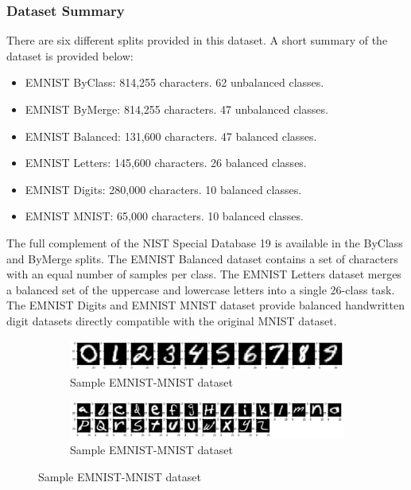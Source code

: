 \subsubsection{Dataset Summary}
There are six different splits provided in this dataset. A short summary of the dataset is provided below:
\begin{itemize}
  \item EMNIST ByClass: 814,255 characters. 62 unbalanced classes.
  \item EMNIST ByMerge: 814,255 characters. 47 unbalanced classes.
  \item EMNIST Balanced:  131,600 characters. 47 balanced classes.
  \item EMNIST Letters: 145,600 characters. 26 balanced classes.
  \item EMNIST Digits: 280,000 characters. 10 balanced classes.
  \item EMNIST MNIST: 65,000 characters. 10 balanced classes.
\end{itemize}
The full complement of the NIST Special Database 19 is available in the ByClass and ByMerge splits. The EMNIST Balanced dataset contains a set of characters with an equal number of samples per class.
The EMNIST Letters dataset merges a balanced set of the uppercase and lowercase letters into a single 26-class task. The EMNIST Digits and EMNIST MNIST dataset provide balanced handwritten digit datasets directly compatible with the original MNIST dataset.

\begin{figure}[htb!]
        \centering
        \begin{subfigure}[b]{\textwidth}
            \centering
            \includegraphics[width=\linewidth]{images/digit.png}
            \caption{Sample EMNIST-MNIST dataset}
            \label{fig:EMNIST MNIST dataset}
        \end{subfigure}%
        \label{fig:Rotate-misclassifications}
        \begin{subfigure}[b]{\textwidth}
            \centering
            \includegraphics[width=\linewidth]{images/letter.png}
            \caption{Sample EMNIST-MNIST dataset}
            \label{fig:EMNIST MNIST dataset}
        \end{subfigure}%
        \label{fig:Rotate-misclassifications}
    \end{figure}
    \FloatBarrier


